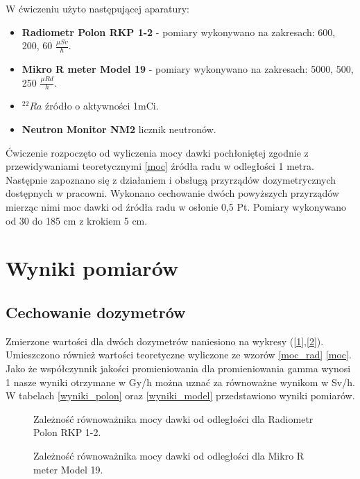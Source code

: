 \documentclass{article}
\begin{document}
W ćwiczeniu użyto następującej aparatury:
\begin{itemize}
	\item \textbf{Radiometr Polon RKP 1-2}  - pomiary wykonywano na zakresach: 600, 200, 60 $\frac{\mu Sv}{h}$.
	\item \textbf{Mikro R meter Model 19} - pomiary wykonywano na zakresach: 5000, 500, 250 $\frac{\mu Rd}{h}$.
	\item \textbf{$^{22}Ra$} źródło o aktywności 1mCi.
	\item \textbf{Neutron Monitor NM2} licznik neutronów.
\end{itemize}
Ćwiczenie rozpoczęto od wyliczenia mocy dawki pochłoniętej zgodnie z przewidywaniami teoretycznymi \ref{moc} źródła radu w odległości 1 metra. Następnie zapoznano się z działaniem i obsługą przyrządów dozymetrycznych dostępnych w pracowni. Wykonano cechowanie dwóch powyższych przyrządów mierząc nimi moc dawki od źródła radu w osłonie 0,5 Pt. Pomiary wykonywano od 30 do 185 cm z krokiem 5 cm.


\section{Wyniki pomiarów}
\subsection{Cechowanie dozymetrów}
Zmierzone wartości dla dwóch dozymetrów naniesiono na wykresy ([\ref{polon_wykres}],[\ref{model_wykres}]). Umieszczono również wartości teoretyczne wyliczone ze wzorów \ref{moc_rad} \ref{moc}. Jako że współczynnik jakości promieniowania dla promieniowania gamma wynosi 1 nasze wyniki otrzymane w Gy/h można uznać za równoważne wynikom w Sv/h. W tabelach \ref{wyniki_polon} oraz \ref{wyniki_model} przedstawiono wyniki pomiarów. 
\begin{figure}[h!]
	\centering	
	\fontsize{8}{12}\selectfont %
	\resizebox{0.7\textwidth}{!}{}		
	\caption{Zależność równoważnika mocy dawki od odległości dla Radiometr Polon RKP 1-2.}
	\label{polon_wykres}
\end{figure}

\begin{figure}[h!]
	\centering	
	\fontsize{8}{12}\selectfont %
	\resizebox{0.7\textwidth}{!}{}		
	\caption{Zależność równoważnika mocy dawki od odległości dla Mikro R meter Model 19.}
	\label{model_wykres}
\end{figure}
\end{document}
